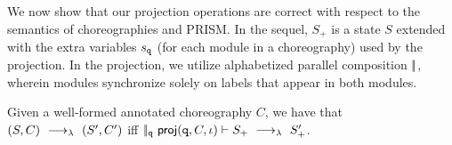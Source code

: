\smallskip

 We now show that our projection operations are
correct with respect to the semantics of choreographies and PRISM. In
the sequel, $S_+$ is a state $S$ extended with the extra variables
$s_{\mathtt{q}}$ (for each module in a choreography) used by the
projection. In the projection, we utilize alphabetized parallel
composition $|\!|$, wherein modules synchronize solely on labels that
appear in both modules.
\begin{theorem}[EPP]\label{thm:epp}
  Given a well-formed annotated choreography $C$, we have that
  $(S,C) \ \longrightarrow_{\lambda}\  (S', C')$ iff
  $|\!|_{\mathtt{q}}\ \mathsf{proj} (\mathtt{q}, C,\iota)\vdash S_{+}
  \ \longrightarrow_{\lambda}\  S_{+}'$.
\end{theorem}
